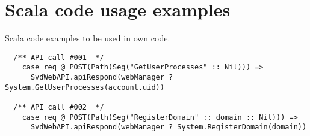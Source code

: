 \documentclass[11pt,a4paper]{scrartcl}
\begin{document}
\section{Scala code usage examples}\label{sec:scalausage}
  Scala code examples to be used in own code.

  \begin{verbatim}
  /** API call #001  */
    case req @ POST(Path(Seg("GetUserProcesses" :: Nil))) =>
      SvdWebAPI.apiRespond(webManager ? System.GetUserProcesses(account.uid))

  /** API call #002  */
    case req @ POST(Path(Seg("RegisterDomain" :: domain :: Nil))) =>
      SvdWebAPI.apiRespond(webManager ? System.RegisterDomain(domain))

  \end{verbatim}
\end{document}
